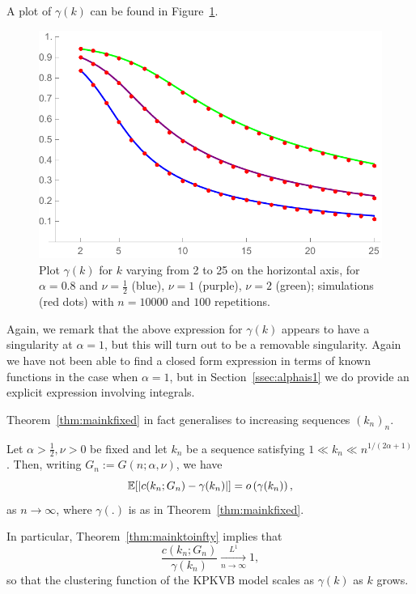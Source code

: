 \noindent
A plot of $\gamma(k)$ can be found in Figure~\ref{fig:gammak}. %
%
%
\begin{figure}[h!]
    \centering
    \includegraphics[scale=0.6]{figures/ckn10000a08nu0512rep100k2to25.pdf}
    \caption{Plot $\gamma(k)$ for $k$ varying from 2 to 25 on the horizontal axis, for $\alpha=0.8$ and $\nu=\frac{1}{2}$ 
    (blue), $\nu=1$ (purple), $\nu=2$ (green); simulations (red dots) with $n=10000$ and $100$ repetitions.\label{fig:gammak}}
\end{figure}%
%
Again, we remark that the above expression for $\gamma(k)$ appears to have a singularity at $\alpha=1$, but this will turn out to be a
removable singularity. Again we have not been able to find a closed form expression in terms of known functions in the case when $\alpha=1$, but
in Section~\ref{ssec:alphais1} we do provide an explicit expression involving integrals.

Theorem~\ref{thm:mainkfixed} in fact generalises to increasing sequences $(k_n)_n$.

\begin{theorem}\label{thm:mainktoinfty}
Let $\alpha>\frac12, \nu>0$ be fixed and let $k_n$ be a sequence 
satisfying $1 \ll k_n \ll n^{1/(2\alpha+1)}$. Then, writing $G_n := G(n;\alpha,\nu)$, we have
\[
	\mathbb{E}[|c(k_n;G_n)-\gamma(k_n)|] = o\left(\gamma(k_n)\right),
\]
as $n \to \infty$, where $\gamma(.)$ is as in Theorem~\ref{thm:mainkfixed}.
\end{theorem}

In particular, Theorem~\ref{thm:mainktoinfty} implies that
\[
	\frac{c(k_n; G_n)}{\gamma(k_n)} \xrightarrow[n\to\infty]{L^1} 1,
\]
so that the clustering function of the KPKVB model scales as $\gamma(k)$ as $k$ grows.

